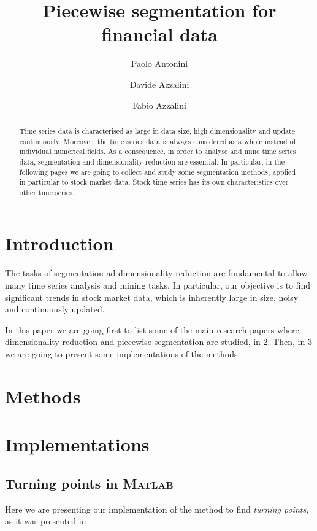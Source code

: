 \documentclass[a4paper]{article}
\title{Piecewise segmentation for financial data}
\author{Paolo Antonini \and Davide Azzalini \and Fabio Azzalini}
\date{}
\newcommand{\matlab}{\textsc{Matlab}\xspace}
\begin{document}
\maketitle


\begin{abstract}
Time series data is characterised as large in data size, high dimensionality and update continuously. Moreover, the time series data is always considered as a whole instead of individual numerical fields. As a consequence, in order to analyse and mine time series data, segmentation and dimensionality reduction are essential. In particular, in the following pages we are going to collect and study some segmentation methods, applied in particular to stock market data. Stock time series has its own characteristics over other time series. 
\end{abstract}

\section{Introduction}
The tasks of segmentation ad dimensionality reduction are fundamental to allow many time series analysis and mining tasks. In particular, our objective is to find significant trends in stock market data, which is inherently large in size, noisy and continuously updated. 

In this paper we are going first to list some of the main research papers where dimensionality reduction and piecewise segmentation are studied, in \cref{sec:methods}. Then, in \cref{sec:implementations} we are going to present some implementations of the methods. 


\section{Methods}\label{sec:methods}
\lipsum[1-3]


\section{Implementations}\label{sec:implementations}

\lipsum[7]

\subsection{Turning points in \matlab}

Here we are presenting our implementation of the method to find \emph{turning points}, as it was presented in %
\end{document}
